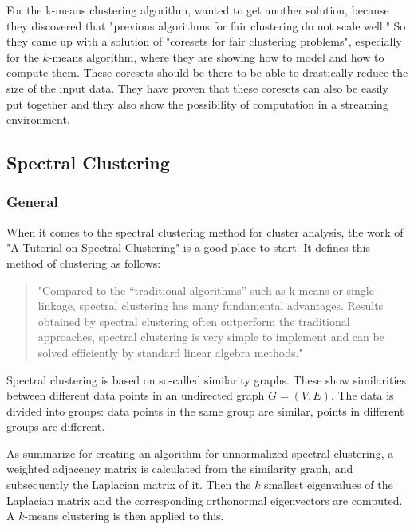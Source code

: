 For the k-means clustering algorithm, \textcite[]{Schmidt2018} wanted to get another solution, because they discovered that "previous algorithms for fair clustering do not scale well." So they came up with a solution of "coresets for fair clustering problems", especially for the $k$-means algorithm, where they are showing how to model and how to compute them. These coresets should be there to be able to drastically reduce the size of the input data. They have proven that these coresets can also be easily put together and they also show the possibility of computation in a streaming environment. \autocite[1]{Schmidt2018} 


\subsection{Spectral Clustering}
\label{spectral-clustering}

\subsubsection{General}

When it comes to the spectral clustering method for cluster analysis, the work of \textcite[]{VonLuxburg2007}  "A Tutorial on Spectral Clustering" is a good place to start. It defines this method of clustering as follows:

\begin{quote}
"Compared to the “traditional algorithms” such as k-means or single linkage, spectral clustering has many fundamental advantages. Results obtained by spectral clustering often outperform the traditional approaches, spectral clustering is very simple to implement and can be solved efficiently by standard linear algebra methods."

\autocite[1]{VonLuxburg2007}
\end{quote}

Spectral clustering is based on so-called similarity graphs. These show similarities between different data points in an undirected graph $G = (V,E)$. The data is divided into groups: data points in the same group are similar, points in different groups are different. \autocite[2]{VonLuxburg2007}

As \textcite[2]{Kleindessner2019} summarize for creating an algorithm for unnormalized spectral clustering, a weighted adjacency matrix is calculated from the similarity graph, and subsequently the Laplacian matrix of it. Then the $k$ smallest eigenvalues of the Laplacian matrix and the corresponding orthonormal eigenvectors are computed. A $k$-means clustering is then applied to this.

